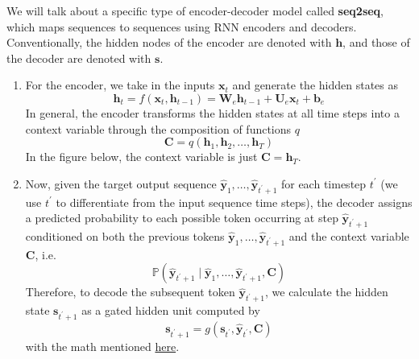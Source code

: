     We will talk about a specific type of encoder-decoder model called \textbf{seq2seq}, which maps sequences to sequences using RNN encoders and decoders. Conventionally, the hidden nodes of the encoder are denoted with $\mathbf{h}$, and those of the decoder are denoted with $\mathbf{s}$. 
    \begin{enumerate}
        \item For the encoder, we take in the inputs $\mathbf{x}_t$ and generate the hidden states as 
        \begin{equation}
          \mathbf{h}_t = f(\mathbf{x}_t, \mathbf{h}_{t-1}) = \mathbf{W}_e \mathbf{h}_{t-1} + \mathbf{U}_e \mathbf{x}_t + \mathbf{b}_e
        \end{equation}
        In general, the encoder transforms the hidden states at all time steps into a context variable through the composition of functions $q$ 
        \[\mathbf{C} = q(\mathbf{h}_1, \mathbf{h}_2, \ldots, \mathbf{h}_T)\]
        In the figure below, the context variable is just $\mathbf{C} = \mathbf{h}_T$. 

        \item Now, given the target output sequence $\hat{\mathbf{y}}_1, \ldots, \hat{\mathbf{y}}_{t^\prime + 1}$ for each timestep $t^\prime$ (we use $t^\prime$ to differentiate from the input sequence time steps), the decoder assigns a predicted probability to each possible token occurring at step $\hat{\mathbf{y}}_{t^\prime + 1}$ conditioned on both the previous tokens $\hat{\mathbf{y}}_1, \ldots, \hat{\mathbf{y}}_{t^\prime + 1}$ and the context variable $\mathbf{C}$, i.e. 
        \[\mathbb{P}(\hat{\mathbf{y}}_{t^\prime + 1} \mid \hat{\mathbf{y}}_1, \ldots, \hat{\mathbf{y}}_{t^\prime + 1}, \mathbf{C})\]
        Therefore, to decode the subsequent token $\hat{\mathbf{y}}_{t^\prime + 1}$, we calculate the hidden state $\mathbf{s}_{t^\prime + 1}$ as a gated hidden unit computed by 
        \[\mathbf{s}_{t^\prime + 1} = g(\mathbf{s}_{t^\prime}, \hat{\mathbf{y}}_{t^\prime}, \mathbf{C})\]
        with the math mentioned \href{https://arxiv.org/pdf/1409.0473.pdf#page=12}{here}. 
    \end{enumerate}

